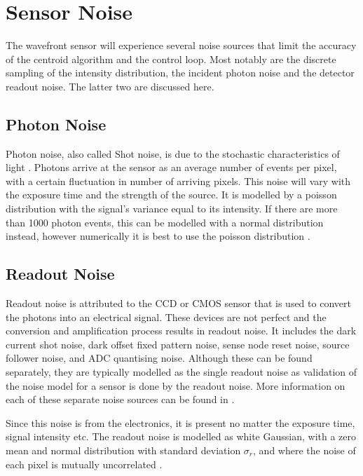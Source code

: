 \section{Sensor Noise}

The wavefront sensor will experience several noise sources that limit the accuracy of the centroid algorithm and the control loop.  Most notably are the discrete sampling of the intensity distribution, the incident photon noise and the detector readout noise.  The latter two are discussed here.  

\subsection{Photon Noise}
Photon noise, also called Shot noise, is due to the stochastic characteristics of light \cite{NumSimCCD2011}.  Photons arrive at the sensor as an average number of events per pixel, with a certain fluctuation in number of arriving pixels.  This noise will vary with the exposure time and the strength of the source.  It is modelled by a poisson distribution with the signal's variance equal to its intensity.  If there are more than 1000 photon events, this can be modelled with a normal distribution instead, however numerically it is best to use the poisson distribution \cite{WFCorr2013}. 

\subsection{Readout Noise}
Readout noise is attributed to the CCD or CMOS sensor that is used to convert the photons into an electrical signal.  These devices are not perfect and the conversion and amplification process results in readout noise.  It includes the dark current shot noise, dark offset fixed pattern noise, sense node reset noise, source follower noise, and ADC quantising noise.  Although these can be found separately, they are typically modelled as the single readout noise as validation of the noise model for a sensor is done by the readout noise. More information on each of these separate noise sources can be found in \cite{NumSimCCD2011}.

Since this noise is from the electronics, it is present no matter the exposure time, signal intensity etc.  The readout noise is modelled as white Gaussian, with a zero mean and normal distribution with standard deviation $\sigma_r$, and where the noise of each pixel is mutually uncorrelated \cite{WFCorr2013}. 

